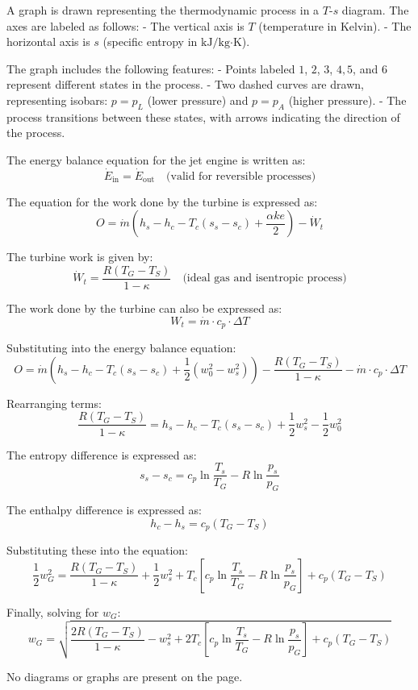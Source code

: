 A graph is drawn representing the thermodynamic process in a \( T \)-\( s \) diagram. The axes are labeled as follows:  
- The vertical axis is \( T \) (temperature in Kelvin).  
- The horizontal axis is \( s \) (specific entropy in \( \text{kJ/kg·K} \)).  

The graph includes the following features:  
- Points labeled \( 1 \), \( 2 \), \( 3 \), \( 4,5 \), and \( 6 \) represent different states in the process.  
- Two dashed curves are drawn, representing isobars: \( p = p_L \) (lower pressure) and \( p = p_A \) (higher pressure).  
- The process transitions between these states, with arrows indicating the direction of the process.

The energy balance equation for the jet engine is written as:  
\[
\dot{E}_{\text{in}} = \dot{E}_{\text{out}} \quad \text{(valid for reversible processes)}
\]  

The equation for the work done by the turbine is expressed as:  
\[
O = \dot{m} \left( h_s - h_c - T_c (s_s - s_c) + \frac{\alpha k e}{2} \right) - \dot{W}_t
\]  

The turbine work is given by:  
\[
\dot{W}_t = \frac{R (T_G - T_S)}{1 - \kappa} \quad \text{(ideal gas and isentropic process)}
\]  

The work done by the turbine can also be expressed as:  
\[
W_t = \dot{m} \cdot c_p \cdot \Delta T
\]  

Substituting into the energy balance equation:  
\[
O = \dot{m} \left( h_s - h_c - T_c (s_s - s_c) + \frac{1}{2} (w_0^2 - w_s^2) \right) - \frac{R (T_G - T_S)}{1 - \kappa} - \dot{m} \cdot c_p \cdot \Delta T
\]  

Rearranging terms:  
\[
\frac{R (T_G - T_S)}{1 - \kappa} = h_s - h_c - T_c (s_s - s_c) + \frac{1}{2} w_s^2 - \frac{1}{2} w_0^2
\]  

The entropy difference is expressed as:  
\[
s_s - s_c = c_p \ln \frac{T_s}{T_G} - R \ln \frac{p_s}{p_G}
\]  

The enthalpy difference is expressed as:  
\[
h_c - h_s = c_p (T_G - T_S)
\]  

Substituting these into the equation:  
\[
\frac{1}{2} w_G^2 = \frac{R (T_G - T_S)}{1 - \kappa} + \frac{1}{2} w_s^2 + T_c \left[ c_p \ln \frac{T_s}{T_G} - R \ln \frac{p_s}{p_G} \right] + c_p (T_G - T_S)
\]  

Finally, solving for \( w_G \):  
\[
w_G = \sqrt{\frac{2 R (T_G - T_S)}{1 - \kappa} - w_s^2 + 2 T_c \left[ c_p \ln \frac{T_s}{T_G} - R \ln \frac{p_s}{p_G} \right] + c_p (T_G - T_S)}
\]  

No diagrams or graphs are present on the page.